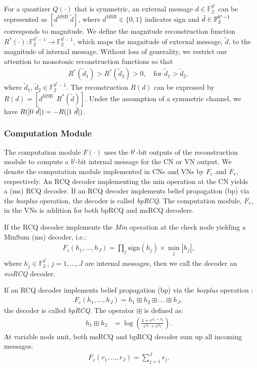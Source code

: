 \documentclass [PhD] {uclathes}
\begin{document}
For a quantizer $Q(\cdot)$ that is symmetric, an external message $d\in\mathbb{F}_2^{b^\text{e}}$ can be represented as $[d^{\text{MSB}}\ \tilde{d}]$, where $d^{\text{MSB}}\in\{0,1\}$ indicates sign and $\Tilde{d}\in\mathbb{F}_2^{b^\text{e}-1}$ corresponds to magnitude. We define the magnitude reconstruction function $R^*(\cdot):\mathbb{F}_2^{b^\text{e}-1}\rightarrow\mathbb{F}_2^{b^\text{i}-1}$, which maps the magnitude of external message, $\tilde{d}$, to the magnitude of internal message. Without loss of generality,  we restrict our attention to monotonic reconstruction functions so that
\begin{align}
    R^*(\tilde{d}_1)>R^*(\tilde{d}_2)>0,\quad \text{for }\tilde{d}_1>\tilde{d}_2,\label{r_mono}
\end{align}
where $\tilde{d}_1$, $\tilde{d}_2\in \mathbb{F}_2^{b^\text{e}-1}$. The reconstruction $R(d)$ can be expressed by
$R(d)=\left[d^{\text{MSB}}\ \ R^*(\tilde{d})\right]$.
Under the assumption of a symmetric channel, we have $R([0\ \Tilde{d}])=-R([1\ \Tilde{d}])$.
\subsubsection{Computation Module}
The computation module \texorpdfstring{$F(\cdot)$}{Lg} uses the $b^\text{\text{i}}$-bit outputs of the reconstruction module to compute a $b^\text{i}$-bit internal message for the CN or VN output. We denote the computation module implemented in CNs and VNs by $F_\text{c}$ and $F_\text{v}$, respectively. An RCQ decoder implementing the min operation at the CN yields a \minsum (ms) RCQ decoder. If an RCQ decoder implements belief propagation (bp) via the \textit{boxplus} operation, the decoder is called \textit{bpRCQ}. The computation module, $F_\mathrm{v}$, in the VNs is addition for both bpRCQ and msRCQ decoders.

If the RCQ decoder implements the \textit{Min} operation at the check node yielding a MinSum (ms) decoder, i.e.:
\begin{align}\label{equ: min}
    F_c(h_1,\ldots,h_J)=\prod_j\text{sign}(h_j)\times \min_{j}|h_j|,
\end{align}
where $h_j\in\mathbb{F}_2^{b^{i}}$, $j=1,...,J$ are internal messages, then we call the decoder an \emph{msRCQ} decoder.

If an RCQ decoder implements belief propagation (bp) via the \textit{boxplus} operation :
\begin{align}
    F_c(h_1,\ldots,h_J)=h_1 \boxplus h_2 \boxplus ... \boxplus h_J \label{equ: bp},
\end{align}
the decoder is called \textit{bpRCQ}. The operator $\boxplus$ is defined as:
\begin{align}
    h_1 \boxplus h_2 &= \log \left(\frac{1+e^{h_1+h_2}}{e^{h_1}+e^{h_2}}\right).
\end{align}
At variable node unit, both msRCQ and bpRCQ decoder sum up all incoming messages:
\begin{align}
    F_v(r_1,\ldots,r_J)=\sum_{j=1}^J r_j.
\end{align}
\end{document}
